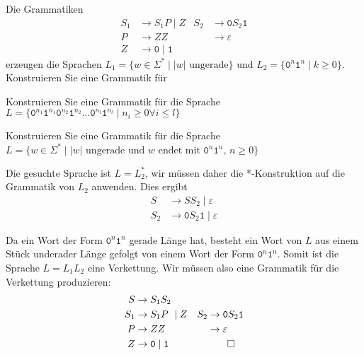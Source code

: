 Die Grammatiken
\begin{align*}
S_1 & \to S_1P \mid Z               & S_2 & \to \texttt{0}S_2\texttt{1}    \\
P   & \to ZZ                        &     & \to \varepsilon                \\
Z   & \to \texttt{0}\mid\texttt{1}  &     &                               
\end{align*}
erzeugen die Sprachen $L_1=\{w\in\Sigma^*\mid  \text{$|w|$ ungerade}\}$
und $L_2=\{\texttt{0}^n\texttt{1}^n \mid k\ge 0\}$.
Konstruieren Sie eine Grammatik für
\begin{teilaufgaben}
\item Konstruieren Sie eine Grammatik für die Sprache $L=\{
\texttt{0}^{n_1}\texttt{1}^{n_1}
\texttt{0}^{n_2}\texttt{1}^{n_2}
\dots
\texttt{0}^{n_l}\texttt{1}^{n_l}
\mid
n_i\ge 0\forall i\le l
\}$
\item Konstruieren Sie eine Grammatik für die Sprache $L=\{
w\in\Sigma^* \mid
\text{$|w|$ ungerade und $w$ endet mit $\texttt{0}^n\texttt{1}^n$, $n\ge 0$}
\}$
\end{teilaufgaben}

\begin{loesung}
\begin{teilaufgaben}
\item
Die gesuchte Sprache ist $L=L_2^*$, wir müssen daher die *-Konstruktion
auf die Grammatik von $L_2$ anwenden.
Dies ergibt 
\begin{align*}
S   & \to SS_2 \mid \varepsilon  \\
S_2 & \to \texttt{0}S_2\texttt{1} \mid \varepsilon
\end{align*}
\item
Da ein Wort der Form $\texttt{0}^n\texttt{1}^n$ gerade Länge hat, besteht
ein Wort von $L$ aus einem Stück underader Länge gefolgt von einem
Wort der Form $\texttt{0}^n\texttt{1}^n$.
Somit ist die Sprache $L=L_1L_2$ eine Verkettung.
Wir müssen also eine Grammatik für die Verkettung produzieren:
\begin{align*}
S   & \to S_1S_2                    &     &                                \\
S_1 & \to S_1P \mid Z               & S_2 & \to \texttt{0}S_2\texttt{1}    \\
P   & \to ZZ                        &     & \to \varepsilon                \\
Z   & \to \texttt{0}\mid\texttt{1}  &     &                               
\qedhere
\end{align*}
\end{teilaufgaben}
\end{loesung}




